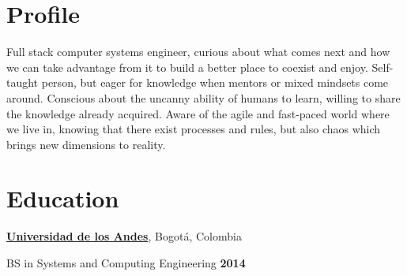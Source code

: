 \section{Profile}
%
Full stack computer systems engineer, curious about what comes next and how we
can take advantage from it to build a better place to coexist and enjoy. 
Self-taught person, but eager for knowledge when mentors or mixed mindsets come around. 
Conscious about the uncanny ability of humans to learn, willing to share
the knowledge already acquired.
Aware of the agile and fast-paced world where we live in, knowing that there exist processes and rules, 
but also chaos which brings new dimensions to reality.

%

%

\section{Education}
%
% 
% 
\href{http://www.uniandes.edu.co/}{\textbf{Universidad de los Andes}},
Bogot\'{a}, Colombia
\begin{outerlist}
\item[] BS in Systems and Computing Engineering \hfill \textbf{2014}
\end{outerlist}

